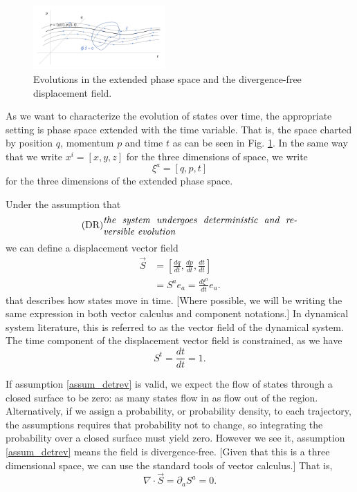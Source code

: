 \documentclass[fleqn,10pt]{wlscirep}
\begin{document}
\begin{figure}
	\includegraphics[width = 0.45\textwidth]{ExtendedPhaseSpace}
	\caption{\footnotesize{Evolutions in the extended phase space and the divergence-free displacement field.}}\label{extended_phase_space}
\end{figure}

As we want to characterize the evolution of states over time, the appropriate setting is phase space extended with the time variable\cite{lanczos1949variational,synge1960encyclopedia}. That is, the space charted by position $q$, momentum $p$ and time $t$ as can be seen in Fig. \ref{extended_phase_space}. In the same way that we write $x^i = [ x, y, z ]$ for the three dimensions of space, we write
\begin{equation}\label{sdof_variables}
	\xi^a = [ q, p, t]
\end{equation}
for the three dimensions of the extended phase space.

Under the assumption that
\begin{align}\label{assum_detrev}
	\tag*{(DR)}
	\parbox{2.8in}{\emph{the system undergoes deterministic and reversible evolution}}
\end{align}
we can define a displacement vector field
\begin{equation}\label{sdof_displacement}
\begin{aligned}
	\vec{S} &= \left[ \frac{dq}{dt},\frac{dp}{dt},\frac{dt}{dt} \right] \\
	&= S^a e_a = \frac{d\xi^a}{dt} e_a .
\end{aligned}
\end{equation}
that describes how states move in time. [Where possible, we will be writing the same expression in both vector calculus and component notations.] In dynamical system literature, this is referred to as the vector field of the dynamical system. The time component of the displacement vector field is constrained, as we have
\begin{equation}\label{sdof_time_constraint}
	S^t=\frac{dt}{dt}=1.
\end{equation}

If assumption \ref{assum_detrev} is valid, we expect the flow of states through a closed surface to be zero: as many states flow in as flow out of the region. Alternatively, if we assign a probability, or probability density, to each trajectory, the assumptions requires that probability not to change, so integrating the probability over a closed surface must yield zero. However we see it, assumption \ref{assum_detrev} means the field is divergence-free.  [Given that this is a three dimensional space, we can use the standard tools of vector calculus.] That is, 
\begin{equation}\label{sdof_div_free}
	\nabla \cdot \vec{S} = \partial_a S^a = 0.
\end{equation}
\end{document}
